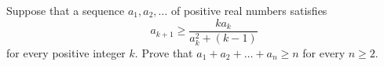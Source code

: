 Suppose that a sequence 
$a_1,a_2,\ldots$
 of positive real numbers satisfies 
\[a_{k+1}\geq\frac{ka_k}{a_k^2+(k-1)}\]
for every positive integer 
$k$.
 Prove that 
$a_1+a_2+\ldots+a_n\geq n$
 for every 
$n\geq2$.
